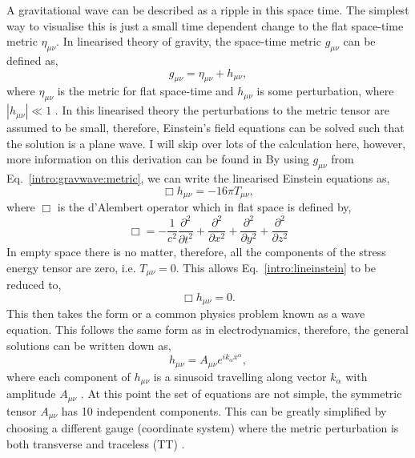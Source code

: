 A gravitational wave can be described as a ripple in this space time.
The simplest way to visualise this is just a small time dependent change to the flat space-time metric $\eta_{\mu\nu}$.
In linearised theory of gravity, the space-time metric $g_{\mu \nu}$ can be defined as,
\begin{equation}
\label{intro:gravwave:metric}
    g_{\mu \nu} = \eta_{\mu \nu} + h_{\mu \nu},
\end{equation}
where $ \eta_{\mu \nu}$ is the metric for flat space-time and $h_{\mu \nu}$ is some perturbation, where $|h_{\mu \nu}| \ll 1$ \citep{flanagan2005BasicsGravitational}. 
In this linearised theory the perturbations to the metric tensor are assumed to be small, therefore, Einstein's field equations can be solved such that the solution is a plane wave. 
I will skip over lots of the calculation here, however, more information on this derivation can be found in \citep{flanagan2005BasicsGravitational,} 
By using $g_{\mu \nu}$ from Eq.~\ref{intro:gravwave:metric}, we can write the linearised Einstein equations as,
\begin{equation}
\label{intro:lineinstein}
    \Box h_{\mu \nu} = -16 \pi T_{\mu\nu},
\end{equation}
where $\Box$ is the d'Alembert operator which in flat space is defined by,
\begin{equation}
		\Box = -\frac{1}{c^2} \frac{\partial^2}{\partial t^2} + \frac{\partial^2}{\partial x^2} + \frac{\partial^2}{\partial y^2} + \frac{\partial^2}{\partial z^2}
\end{equation}
In empty space there is no matter, therefore, all the components of the stress energy tensor  are zero, i.e. $T_{\mu \nu} = 0$.
This allows Eq.~\ref{intro:lineinstein} to be reduced to, 
\begin{equation}
    \Box h_{\mu \nu} = 0.
\end{equation}
This then takes the form or a common physics problem known as a wave equation. 
This follows the same form as in electrodynamics, therefore, the general solutions can be written down as,
\begin{equation}
    h_{\mu\nu} = A_{\mu\nu}e^{ik_{\alpha} x^{\alpha}},
\end{equation}
where each component of $h_{\mu \nu}$ is a sinusoid travelling along vector $k_{\alpha}$ with amplitude $A_{\mu\nu}$ \citep{capano2011SearchingGravitational}.
At this point the set of equations are not simple, the symmetric tensor $A_{\mu \nu}$ has 10 independent components.
This can be greatly simplified by choosing a different gauge (coordinate system) where the metric perturbation is both transverse and traceless (TT) \citep{flanagan2005BasicsGravitational}.
